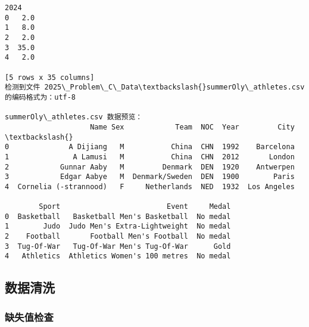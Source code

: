 \documentclass[11pt]{article}
\begin{document}
\begin{Verbatim}[commandchars=\\\{\}]
   2024
0   2.0
1   8.0
2   2.0
3  35.0
4   2.0

[5 rows x 35 columns]
检测到文件 2025\_Problem\_C\_Data\textbackslash{}summerOly\_athletes.csv 的编码格式为：utf-8

summerOly\_athletes.csv 数据预览：
                    Name Sex            Team  NOC  Year         City  \textbackslash{}
0              A Dijiang   M           China  CHN  1992    Barcelona
1               A Lamusi   M           China  CHN  2012       London
2            Gunnar Aaby   M         Denmark  DEN  1920    Antwerpen
3            Edgar Aabye   M  Denmark/Sweden  DEN  1900        Paris
4  Cornelia (-strannood)   F     Netherlands  NED  1932  Los Angeles

        Sport                         Event     Medal
0  Basketball   Basketball Men's Basketball  No medal
1        Judo  Judo Men's Extra-Lightweight  No medal
2    Football       Football Men's Football  No medal
3  Tug-Of-War   Tug-Of-War Men's Tug-Of-War      Gold
4   Athletics  Athletics Women's 100 metres  No medal
    \end{Verbatim}

    \subsection{数据清洗}\label{ux6570ux636eux6e05ux6d17}

    \subsubsection{缺失值检查}\label{ux7f3aux5931ux503cux68c0ux67e5}
\end{document}
